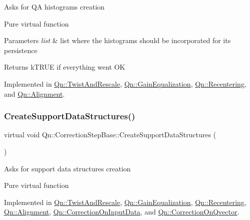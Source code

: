 Asks for QA histograms creation

Pure virtual function 
\begin{DoxyParams}{Parameters}
{\em list} & list where the histograms should be incorporated for its persistence \\
\hline
\end{DoxyParams}
\begin{DoxyReturn}{Returns}
k\+T\+R\+UE if everything went OK 
\end{DoxyReturn}


Implemented in \mbox{\hyperlink{classQn_1_1TwistAndRescale_a048fe37fdbd61696d5b0ed7eadbde1d1}{Qn\+::\+Twist\+And\+Rescale}}, \mbox{\hyperlink{classQn_1_1GainEqualization_a52c68c9bb9632a1e56341dff9e360362}{Qn\+::\+Gain\+Equalization}}, \mbox{\hyperlink{classQn_1_1Recentering_a2edebcd0303549d8ca342fdeb913046b}{Qn\+::\+Recentering}}, and \mbox{\hyperlink{classQn_1_1Alignment_a1b2499a48a748c4064804e0a5a283272}{Qn\+::\+Alignment}}.

\mbox{\label{classQn_1_1CorrectionStepBase_a800ac634950eb231d72033b03cc899cd}} 
\subsubsection{\texorpdfstring{Create\+Support\+Data\+Structures()}{CreateSupportDataStructures()}}
{\footnotesize\ttfamily virtual void Qn\+::\+Correction\+Step\+Base\+::\+Create\+Support\+Data\+Structures (\begin{DoxyParamCaption}{ }\end{DoxyParamCaption})\hspace{0.3cm}{\ttfamily [pure virtual]}}

Asks for support data structures creation

Pure virtual function 

Implemented in \mbox{\hyperlink{classQn_1_1TwistAndRescale_af28bb42098c1b3138769d1747f06468f}{Qn\+::\+Twist\+And\+Rescale}}, \mbox{\hyperlink{classQn_1_1GainEqualization_a3b1da6e8711ef1e7dea394d3612ee8f9}{Qn\+::\+Gain\+Equalization}}, \mbox{\hyperlink{classQn_1_1Recentering_a6aa8507e24f482af1d7fdd55151b3d34}{Qn\+::\+Recentering}}, \mbox{\hyperlink{classQn_1_1Alignment_afb0137bb2443eb44448bf15734096765}{Qn\+::\+Alignment}}, \mbox{\hyperlink{classQn_1_1CorrectionOnInputData_a7da5cb5e6c82e28e2dd63d82ac82bc8a}{Qn\+::\+Correction\+On\+Input\+Data}}, and \mbox{\hyperlink{classQn_1_1CorrectionOnQvector_ac7c019bc36ac90618ed6e5fc768ca593}{Qn\+::\+Correction\+On\+Qvector}}.

